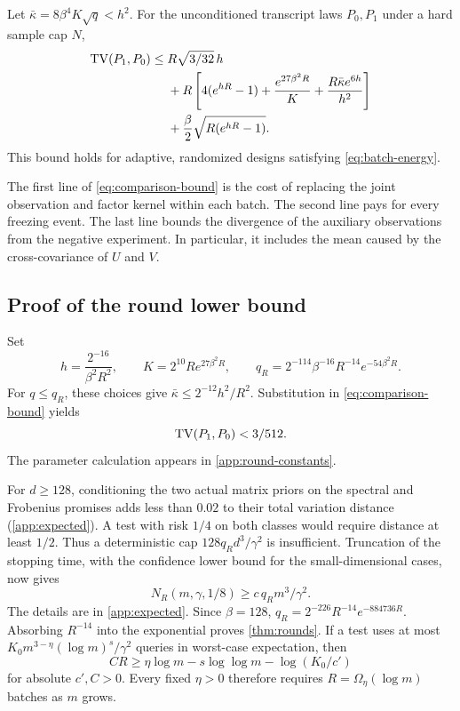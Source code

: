 \begin{lemma}
\label{lem:batch-comparison}
Let $\bar\kappa=8\beta^4K\sqrt q<h^2$.
For the unconditioned transcript laws $P_0,P_1$ under a hard sample cap $N$,
\begin{align}
 \operatorname{TV}(P_1,P_0)
 \le{}&R\sqrt{3/32}\,h \notag\\
 &+R\left[
 4(e^{hR}-1)+\frac{e^{27\beta^2R}}{K}
       +\frac{R\bar\kappa e^{6h}}{h^2}
       \right]\label{eq:comparison-bound}\\
 &+\frac{\beta}{2}\sqrt{R(e^{hR}-1)}.\notag
\end{align}
This bound holds for adaptive, randomized designs satisfying \cref{eq:batch-energy}.
\end{lemma}

The first line of \cref{eq:comparison-bound} is the cost of replacing the joint observation and factor kernel within each batch. The second line pays for every freezing event. The last line bounds the divergence of the auxiliary observations from the negative experiment. In particular, it includes the mean caused by the cross-covariance of $U$ and $V$.

\subsection{Proof of the round lower bound}

Set
\begin{equation}
 h=\frac{2^{-16}}{\beta^2R^2},\qquad
 K=2^{10}R e^{27\beta^2R},\qquad
 q_R=2^{-114}\beta^{-16}R^{-14}e^{-54\beta^2R}.
 \label{eq:round-parameters}
\end{equation}
For $q\le q_R$, these choices give
$\bar\kappa\le2^{-12}h^2/R^2$.
Substitution in \cref{eq:comparison-bound} yields
\begin{equation}
 \operatorname{TV}(P_1,P_0)<3/512.
 \label{eq:round-tv}
\end{equation}
The parameter calculation appears in \cref{app:round-constants}.

For $d\ge128$, conditioning the two actual matrix priors on the spectral and Frobenius promises adds less than $0.02$ to their total variation distance (\cref{app:expected}). A test with risk $1/4$ on both classes would require distance at least $1/2$. Thus a deterministic cap $128q_Rd^3/\gamma^2$ is insufficient. Truncation of the stopping time, with the confidence lower bound for the small-dimensional cases, now gives
\begin{equation}
 N_R(m,\gamma,1/8)\ge c\,q_R m^3/\gamma^2 .
 \label{eq:explicit-round}
\end{equation}
The details are in \cref{app:expected}. Since $\beta=128$,
$q_R=2^{-226}R^{-14}e^{-884736R}$. Absorbing $R^{-14}$ into the exponential proves \cref{thm:rounds}. If a test uses at most $K_0 m^{3-\eta}(\log m)^s/\gamma^2$ queries in worst-case expectation, then
\[
 CR\ge\eta\log m-s\log\log m-\log(K_0/c')
\]
for absolute $c',C>0$. Every fixed $\eta>0$ therefore requires $R=\Omega_\eta(\log m)$ batches as $m$ grows.
